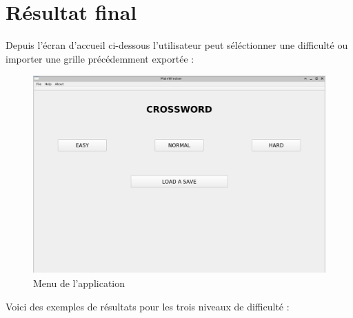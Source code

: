 \documentclass [ 11 pt ] {article}
\begin{document}
\newpage
\section{Résultat final}
Depuis l'écran d'accueil ci-dessous l'utilisateur peut séléctionner une difficulté ou importer une grille précédemment exportée :
\begin{figure}[H] 
 \center 
 \includegraphics[height=3in]{resultats/menu.png}
 \caption{Menu de l'application}
 \end{figure}

Voici des exemples de résultats pour les trois niveaux de difficulté :
\end{document}
